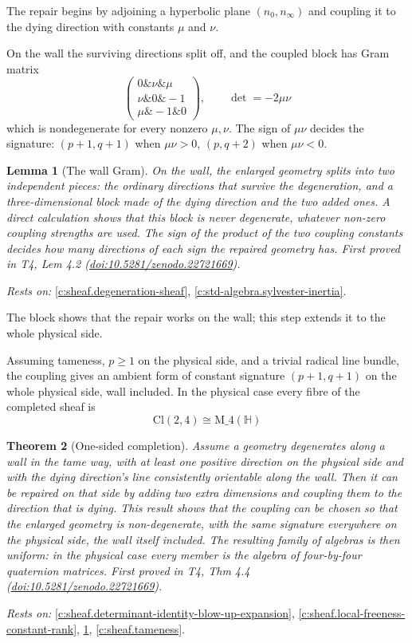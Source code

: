 \documentclass[11pt]{article}
\newtheorem{theorem}{Theorem}[section]
\newtheorem{lemma}[theorem]{Lemma}
\theoremstyle{definition}
\theoremstyle{plain}
\providecommand{\Cl}{}\renewcommand{\Cl}{\mathrm{Cl}}
\providecommand{\HH}{}\renewcommand{\HH}{\mathbb{H}}
\providecommand{\Mat}{}\renewcommand{\Mat}{\mathrm{M}}
\providecommand{\nInf}{}\renewcommand{\nInf}{n_\infty}
\providecommand{\nO}{}\renewcommand{\nO}{n_0}
\begin{document}
The repair begins by adjoining a hyperbolic plane $(\nO, \nInf)$ and coupling it to the dying direction with constants $\mu$ and $\nu$.

On the wall the surviving directions split off, and the coupled block has Gram matrix \[ \begin{pmatrix} 0 \& \nu \& \mu \\ \nu \& 0 \& -1 \\ \mu \& -1 \& 0 \end{pmatrix}, \qquad \det = -2\mu\nu \] which is nondegenerate for every nonzero $\mu, \nu$. The sign of $\mu\nu$ decides the signature: $(p{+}1, q{+}1)$ when $\mu\nu > 0$, $(p, q{+}2)$ when $\mu\nu < 0$.

\begin{lemma}[The wall Gram]\label{c:sheaf.wall-gram}
On the wall, the enlarged geometry splits into two independent pieces: the ordinary directions that survive the degeneration, and a three-dimensional block made of the dying direction and the two added ones. A direct calculation shows that this block is never degenerate, whatever non-zero coupling strengths are used. The sign of the product of the two coupling constants decides how many directions of each sign the repaired geometry has.
\emph{First proved in} T4, Lem 4.2 (\href{https://doi.org/10.5281/zenodo.22721669}{doi:10.5281/zenodo.22721669}).
\end{lemma}
\noindent\emph{Rests on:} \ref{c:sheaf.degeneration-sheaf}, \ref{c:std-algebra.sylvester-inertia}.

The block shows that the repair works on the wall; this step extends it to the whole physical side.

Assuming tameness, $p \geq 1$ on the physical side, and a trivial radical line bundle, the coupling gives an ambient form of constant signature $(p{+}1, q{+}1)$ on the whole physical side, wall included. In the physical case every fibre of the completed sheaf is \[ \Cl(2,4) \cong \Mat\_4(\HH) \]

\begin{theorem}[One-sided completion]\label{c:sheaf.one-sided-completion}
Assume a geometry degenerates along a wall in the tame way, with at least one positive direction on the physical side and with the dying direction's line consistently orientable along the wall. Then it can be repaired on that side by adding two extra dimensions and coupling them to the direction that is dying. This result shows that the coupling can be chosen so that the enlarged geometry is non-degenerate, with the same signature everywhere on the physical side, the wall itself included. The resulting family of algebras is then uniform: in the physical case every member is the algebra of four-by-four quaternion matrices.
\emph{First proved in} T4, Thm 4.4 (\href{https://doi.org/10.5281/zenodo.22721669}{doi:10.5281/zenodo.22721669}).
\end{theorem}
\noindent\emph{Rests on:} \ref{c:sheaf.determinant-identity-blow-up-expansion}, \ref{c:sheaf.local-freeness-constant-rank}, \ref{c:sheaf.wall-gram}, \ref{c:sheaf.tameness}.
\end{document}
